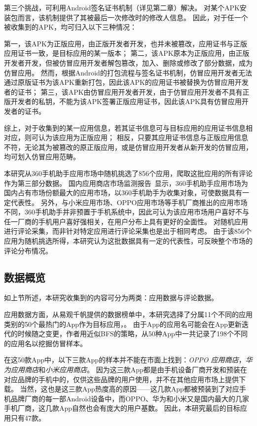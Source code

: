 第三个挑战，可利用Android签名证书机制（详见第二章）解决。
对某个APK安装包而言，该机制提供了其被最后一次修改时的修改人信息。
因此，对于任一个被\mytool 收集到的APK，均可归入以下三种情况：

第一，该APK为正版应用，由正版开发者开发，也并未被篡改，应用证书与正版应用证书一致，是目标应用的某一版本；
第二，该APK原本为正版应用，由正版开发者开发，但被仿冒应用开发者解包篡改，加入、删除或修改了部分数据，成为仿冒应用。
然而，根据Android的打包流程与签名证书机制，仿冒应用开发者无法通过原版证书为该APK重新打包，因此该APK的应用证书被替换为仿冒应用开发者的证书；
第三，该APK由仿冒应用开发者开发，由于仿冒应用开发者不具有正版开发者的私钥，不能为该APK签署正版应用证书，因此该APK具有仿冒应用开发者的证书。

综上，对于收集到的某一应用信息，若其证书信息可与目标应用的应用证书信息相对应，则可认为该应用为正版应用；
相反，只要其应用证书信息与正版应用信息不符，无论其为被篡改的原正版应用，或是仿冒应用开发者从新开发的仿冒应用，均可划入仿冒应用范畴。

本研究从360手机助手应用市场中随机挑选了856个应用，爬取这批应用的所有评论作为第三部分数据。
国内应用商店市场监测报告~\cite{ChineseAppStoreReport}显示，360手机助手应用市场为国内占有市场份额最大的应用市场，以360手机助手为收集对象，可使数据具有一定代表性。
另外，与小米应用市场、OPPO应用市场等手机厂商推出的应用市场不同，360手机助手并非预置于手机系统中，因此可认为该应用市场用户喜好不与任一厂商的手机用户喜好强相关，在用户分布上具有更好的全面性。
对随机应用进行评论采集，而非针对特定应用进行评论采集也是出于相同考虑。
由于该856个应用为随机挑选所得，本研究认为这批数据具有一定的代表性，可反映整个市场的评论分布情况。

\subsection{数据概览}
\label{sec:data_overview}

如上节所述，本研究收集到的内容可分为两类：应用数据与评论数据。

应用数据方面，从易观千帆提供的数据榜单中，本研究选择了分属11个不同的应用类别的50个最热门的App作为目标应用，。
由于App的应用名可能会在App更新迭代的时候随之变更，作者用近似BFS的策略，从50种App中一共记录了198个不同的应用名以挖掘仿冒样本。

在这50款App中，以下三款App的样本并不能在市面上找到：\emph{OPPO 应用商店}，\emph{华为应用商店}和\emph{小米应用商店}。
因为这三款App都是由手机设备厂商开发和预装在对应品牌的手机中的，仅供这些品牌的用户使用，并不在其他应用市场上提供下载。
当然，这也是这三款App热度高的原因——这几款App都被预装到了对应手机品牌厂商的每一部Android设备中，而OPPO、华为和小米又是国内最大的几家手机厂商，这几款App自然也会有庞大的用户基数。
因此，本研究最后的目标应用只有47款。

